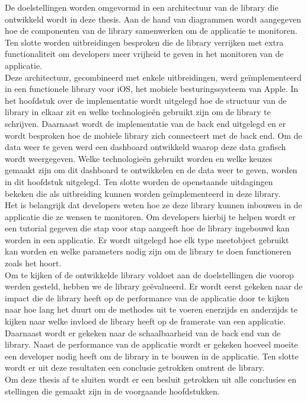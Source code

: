 De doelstellingen worden omgevormd in een architectuur van de library die ontwikkeld wordt in deze thesis. Aan de hand van diagrammen wordt aangegeven hoe de componenten van de library samenwerken om de applicatie te monitoren. Ten slotte worden uitbreidingen besproken die de library verrijken met extra functionaliteit om developers meer vrijheid te geven in het monitoren van de applicatie. \\

Deze architectuur, gecombineerd met enkele uitbreidingen, werd ge\"implementeerd in een functionele library voor iOS, het mobiele besturingssysteem van Apple. In het hoofdstuk over de implementatie wordt uitgelegd hoe de structuur van de library in elkaar zit en welke technologie\"en gebruikt zijn om de library te schrijven. Daarnaast wordt de implementatie van de back end uitgelegd en er wordt besproken hoe de mobiele library zich connecteert met de back end. Om de data weer te geven werd een dashboard ontwikkeld waarop deze data grafisch wordt weergegeven. Welke technologie\"en gebruikt worden en welke keuzes gemaakt zijn om dit dashboard te ontwikkelen en de data weer te geven, worden in dit hoofdstuk uitgelegd. Ten slotte worden de openstaande uitdagingen bekeken die als uitbreiding kunnen worden ge\"implementeerd in deze library.\\


Het is belangrijk dat developers weten hoe ze deze library kunnen inbouwen in de applicatie die ze wensen te monitoren. Om developers hierbij te helpen wordt er een tutorial gegeven die stap voor stap aangeeft hoe de library ingebouwd kan worden in een applicatie. Er wordt uitgelegd hoe elk type meetobject gebruikt kan worden en welke parameters nodig zijn om de library te doen functioneren zoals het hoort. \\

Om te kijken of de ontwikkelde library voldoet aan de doelstellingen die voorop werden gesteld, hebben we de library ge\"evalueerd. Er wordt eerst gekeken naar de impact die de library heeft op de performance van de applicatie door te kijken naar hoe lang het duurt om de methodes uit te voeren enerzijds en anderzijds te kijken naar welke invloed de library heeft op de framerate van een applicatie. Daarnaast wordt er gekeken naar de schaalbaarheid van de back end van de library. Naast de performance van de applicatie wordt er gekeken hoeveel moeite een developer nodig heeft om de library in te bouwen in de applicatie. Ten slotte wordt er uit deze resultaten een conclusie getrokken omtrent de library. \\

Om deze thesis af te sluiten wordt er een besluit getrokken uit alle conclusies en stellingen die gemaakt zijn in de voorgaande hoofdstukken. \\


